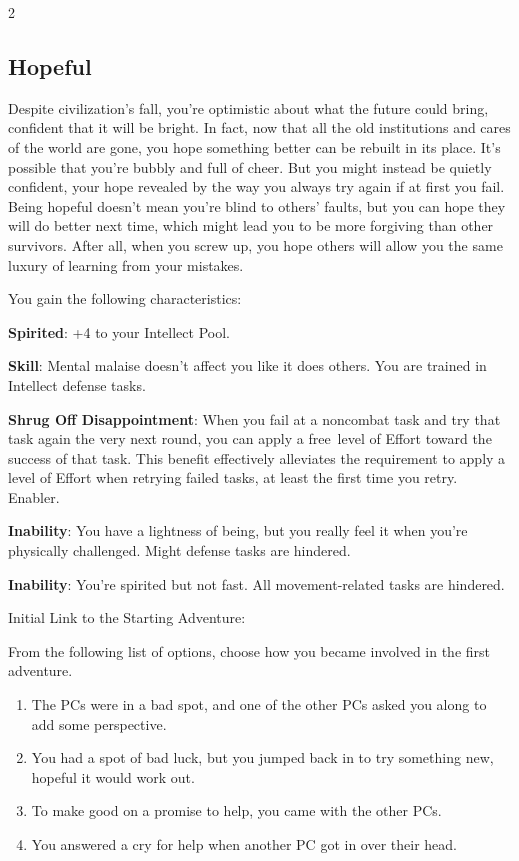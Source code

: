 \begin{multicols}{2}
\subsection{Hopeful}

Despite civilization’s fall, you’re optimistic about what the future could bring, confident 
that it will be bright. In fact, now that all the old institutions and cares of the world are gone, you hope something better can be rebuilt in its place. It’s possible that you’re bubbly and full of cheer. But you might instead be quietly confident, your hope revealed by the way you always try again if at first you fail. Being hopeful doesn’t mean you’re blind to others’ faults, but you can hope they will do better next time, which might lead you to be more forgiving than other survivors. After all, when you screw up, you hope others will allow you the same luxury of learning from your mistakes.

You gain the following characteristics:

\textbf{Spirited}: +4 to your Intellect Pool.

\textbf{Skill}: Mental malaise doesn’t affect you like it does others. You are trained in Intellect defense tasks.

\textbf{Shrug Off Disappointment}: When you fail at a noncombat task and try that task again the very next round, you can apply a free level of Effort toward the success of that task. This benefit effectively alleviates the requirement to apply a level of Effort when retrying failed tasks, at least the first time you retry. Enabler.

\textbf{Inability}: You have a lightness of being, but you really feel it when you’re physically challenged. Might defense tasks are hindered.

\textbf{Inability}: You’re spirited but not fast. All movement-related tasks are hindered.

Initial Link to the Starting Adventure:

From the following list of options, choose how you became involved in the first adventure.
\begin{enumerate}
\item  The PCs were in a bad spot, and one of the other PCs asked you along to add some perspective.
\item  You had a spot of bad luck, but you jumped back in to try something new, hopeful it would work out.
\item  To make good on a promise to help, you came with the other PCs.
\item  You answered a cry for help when another PC got in over their head.
\end{enumerate}


\end{multicols}
